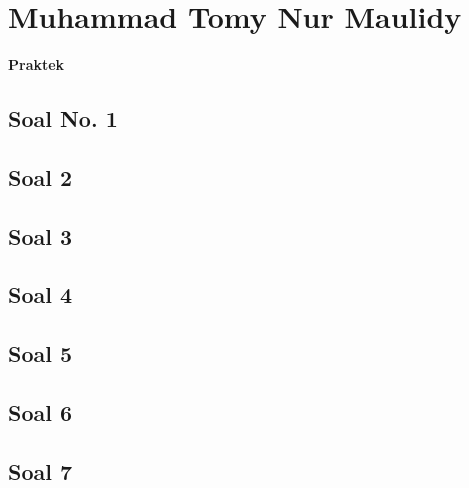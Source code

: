 \section{Muhammad Tomy Nur Maulidy}
{\Large \textbf{Praktek}}
\subsection{Soal No. 1}

\hfill \break
 

\subsection{Soal 2}

\hfill \break


\subsection{Soal 3}

\hfill \break
 

\subsection{Soal 4}

\hfill \break
 

\subsection{Soal 5}

\hfill \break
 

\subsection{Soal 6}

\hfill \break
 

\subsection{Soal 7}

\hfill \break
 

